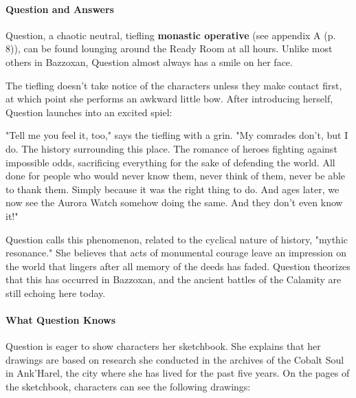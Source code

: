 \documentclass[a4paper, 11pt, bg=full, twocolumn, nooutline]{dndbook}
\begin{document}
\paragraph{Question and Answers}

Question, a chaotic neutral, tiefling \textbf{monastic operative} (see appendix A (p. 8)), can be found lounging around the Ready Room at all hours. Unlike most others in Bazzoxan, Question almost always has a smile on her face.

The tiefling doesn't take notice of the characters unless they make contact first, at which point she performs an awkward little bow. After introducing herself, Question launches into an excited spiel:

\begin{DndReadAloud}
"Tell me you feel it, too," says the tiefling with a grin. "My comrades don't, but I do. The history surrounding this place. The romance of heroes fighting against impossible odds, sacrificing everything for the sake of defending the world. All done for people who would never know them, never think of them, never be able to thank them. Simply because it was the right thing to do. And ages later, we now see the Aurora Watch somehow doing the same. And they don't even know it!"
\end{DndReadAloud}

Question calls this phenomenon, related to the cyclical nature of history, "mythic resonance." She believes that acts of monumental courage leave an impression on the world that lingers after all memory of the deeds has faded. Question theorizes that this has occurred in Bazzoxan, and the ancient battles of the Calamity are still echoing here today.

\paragraph{What Question Knows}

Question is eager to show characters her sketchbook. She explains that her drawings are based on research she conducted in the archives of the Cobalt Soul in Ank'Harel, the city where she has lived for the past five years. On the pages of the sketchbook, characters can see the following drawings:
\end{document}
